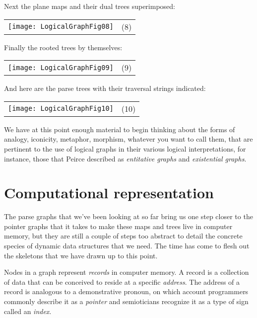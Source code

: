 \documentclass[12pt]{article}
\begin{document}
Next the plane maps and their dual trees superimposed:

\begin{center}\begin{tabular}{cc}
\texttt{[image: LogicalGraphFig08]} & (8) \\
\end{tabular}\end{center}

Finally the rooted trees by themselves:

\begin{center}\begin{tabular}{cc}
\texttt{[image: LogicalGraphFig09]} & (9) \\
\end{tabular}\end{center}

And here are the parse trees with their traversal strings indicated:

\begin{center}\begin{tabular}{cc}
\texttt{[image: LogicalGraphFig10]} & (10) \\
\end{tabular}\end{center}

We have at this point enough material to begin thinking about the forms of analogy, iconicity, metaphor, morphism, whatever you want to call them, that are pertinent to the use of logical graphs in their various logical interpretations, for instance, those that Peirce described as \textit{entitative graphs} and \textit{existential graphs}.

\section{Computational representation}

The parse graphs that we've been looking at so far bring us one step closer to the pointer graphs that it takes to make these maps and trees live in computer memory, but they are still a couple of steps too abstract to detail the concrete species of dynamic data structures that we need.  The time has come to flesh out the skeletons that we have drawn up to this point.

Nodes in a graph represent \textit{records} in computer memory.  A record is a collection of data that can be conceived to reside at a specific \textit{address}.  The address of a record is analogous to a demonstrative pronoun, on which account programmers commonly describe it as a \textit{pointer} and semioticians recognize it as a type of sign called an \textit{index}.
\end{document}
